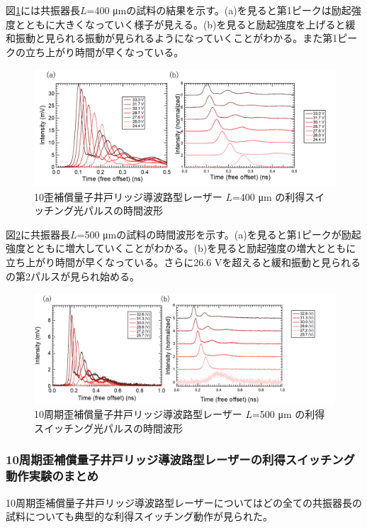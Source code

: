 {図\ref{fig:fig_3_2_10QW_ridge_L400_GS}には共振器長$L$=400 \si{\micro\metre}の試料の結果を示す。(a)を見ると第1ピークは励起強度とともに大きくなっていく様子が見える。(b)を見ると励起強度を上げると緩和振動と見られる振動が見られるようになっていくことがわかる。また第1ピークの立ち上がり時間が早くなっている。
\begin{figure}[h]
	\centering
	\includegraphics[width=15cm]{figure/fig_3_2_10QW_ridge_L400_GS.png}
		\caption{10歪補償量子井戸リッジ導波路型レーザー $L$=400 \si{\micro\metre} の利得スイッチング光パルスの時間波形}
		\label{fig:fig_3_2_10QW_ridge_L400_GS}
\end{figure}

図\ref{fig:fig_3_2_10QW_ridge_L500_GS}に共振器長$L$=500 \si{\micro\metre}の試料の時間波形を示す。(a)を見ると第1ピークが励起強度とともに増大していくことがわかる。(b)を見ると励起強度の増大とともに立ち上がり時間が早くなっている。さらに26.6 Vを超えると緩和振動と見られるの第2パルスが見られ始める。
\begin{figure}[h]
	\centering
	\includegraphics[width=15cm]{figure/fig_3_2_10QW_ridge_L500_GS.png}
		\caption{10周期歪補償量子井戸リッジ導波路型レーザー $L$=500 \si{\micro\metre} の利得スイッチング光パルスの時間波形}
		\label{fig:fig_3_2_10QW_ridge_L500_GS}
\end{figure}

\newpage
\subsubsection{10周期歪補償量子井戸リッジ導波路型レーザーの利得スイッチング動作実験のまとめ}
10周期歪補償量子井戸リッジ導波路型レーザーについてはどの全ての共振器長の試料についても典型的な利得スイッチング動作が見られた。


}
